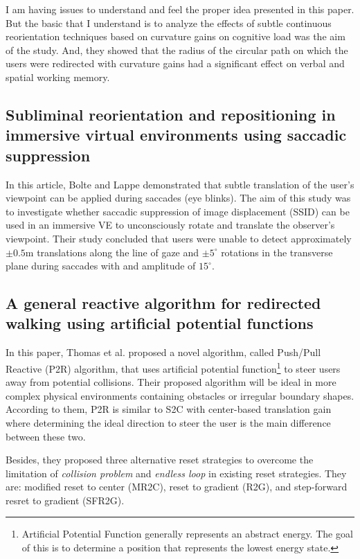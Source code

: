 \documentclass[12pt]{article}
\begin{document}
I am having issues to understand and feel the proper idea presented in this paper. But the basic that I understand is to analyze the effects of subtle continuous reorientation techniques based on curvature gains on cognitive load was the aim of the study. And, they showed that the radius of the circular path on which the users were redirected with curvature gains had a significant effect on verbal and spatial working memory.

\subsection{Subliminal reorientation and repositioning in immersive virtual environments using saccadic suppression}
\textbf{\cite{bolte2015subliminal}}

In this article, Bolte and Lappe demonstrated that subtle translation of the user's viewpoint can be applied during saccades (eye blinks). The aim of this study was to investigate whether saccadic suppression of image displacement (SSID) can be used in an immersive VE to unconsciously rotate and translate the observer's viewpoint. Their study concluded that users were unable to detect approximately $\pm 0.5$m translations along the line of gaze and $\pm 5^{\circ}$ rotations in the transverse plane during saccades with and amplitude of $15^{\circ}$.

\subsection{A general reactive algorithm for redirected walking using artificial potential functions}
\textbf{\cite{thomas2019general}}

In this paper, Thomas et al. proposed a novel algorithm, called Push/Pull Reactive (P2R) algorithm, that uses artificial potential function\footnote{Artificial Potential Function generally represents an abstract energy. The goal of this is to determine a position that represents the lowest energy state.} to steer users away from potential collisions. Their proposed algorithm will be ideal in more complex physical environments containing obstacles or irregular boundary shapes. According to them, P2R is similar to S2C with center-based translation gain where determining the ideal direction to steer the user is the main difference between these two.

Besides, they proposed three alternative reset strategies to overcome the limitation of \emph{collision problem} and \emph{endless loop} in existing reset strategies. They are: modified reset to center (MR2C), reset to gradient (R2G), and step-forward resret to gradient (SFR2G).
\end{document}
